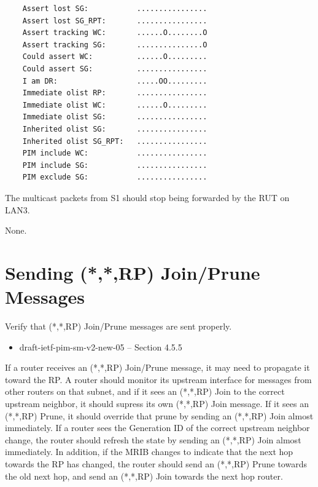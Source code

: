 \documentclass[11pt]{report}
\begin{document}
\begin{itemize}
\begin{verbatim}
    Assert lost SG:           ................
    Assert lost SG_RPT:       ................
    Assert tracking WC:       ......O........O
    Assert tracking SG:       ...............O
    Could assert WC:          ......O.........
    Could assert SG:          ................
    I am DR:                  .....OO.........
    Immediate olist RP:       ................
    Immediate olist WC:       ......O.........
    Immediate olist SG:       ................
    Inherited olist SG:       ................
    Inherited olist SG_RPT:   ................
    PIM include WC:           ................
    PIM include SG:           ................
    PIM exclude SG:           ................
\end{verbatim}

  The multicast packets from S1 should stop being forwarded by the RUT on
  LAN3.

\end{itemize}

None.

\newpage
\section{Sending (*,*,RP) Join/Prune Messages}

Verify that (*,*,RP) Join/Prune messages are sent properly.

\begin{itemize}
  \item draft-ietf-pim-sm-v2-new-05 -- Section 4.5.5
\end{itemize}

If a router receives an (*,*,RP) Join/Prune message, it may need to propagate
it toward the RP. A router should monitor its upstream interface for messages
from other routers on that subnet, and if it sees an (*,*,RP) Join to the
correct upstream neighbor, it should supress its own (*,*,RP) Join message.
If it sees an (*,*,RP) Prune, it should override that prune by sending an
(*,*,RP) Join almost immediately. If a router sees the Generation ID of the
correct upstream neighbor change, the router should refresh the state by
sending an (*,*,RP) Join almost immediately. In addition, if the MRIB changes
to indicate that the next hop towards the RP has changed, the router should
send an (*,*,RP) Prune towards the old next hop, and send an (*,*,RP) Join
towards the next hop router.
\end{document}
